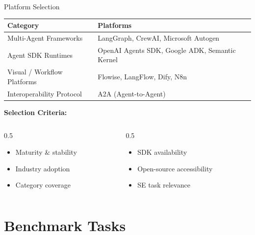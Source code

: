\documentclass[aspectratio=169]{beamer}
\begin{document}
\begin{frame}{Platform Selection}
    \begin{table}
        \centering
        \footnotesize
        \begin{tabular}{ll}
            \toprule
            \textbf{Category}           & \textbf{Platforms}                             \\
            \midrule
            Multi-Agent Frameworks      & LangGraph, CrewAI, Microsoft Autogen           \\
            \midrule
            Agent SDK Runtimes          & OpenAI Agents SDK, Google ADK, Semantic Kernel \\
            \midrule
            Visual / Workflow Platforms & Flowise, LangFlow, Dify, N8n                   \\
            \midrule
            Interoperability Protocol   & A2A (Agent-to-Agent)                           \\
            \bottomrule
        \end{tabular}
    \end{table}

    \vspace{0.3cm}
    \textbf{Selection Criteria:}
    \begin{columns}
        \begin{column}{0.5\textwidth}
            \begin{itemize}
                \item Maturity \& stability
                \item Industry adoption
                \item Category coverage
            \end{itemize}
        \end{column}
        \begin{column}{0.5\textwidth}
            \begin{itemize}
                \item SDK availability
                \item Open-source accessibility
                \item SE task relevance
            \end{itemize}
        \end{column}
    \end{columns}
\end{frame}

\section{Benchmark Tasks}
\end{document}
